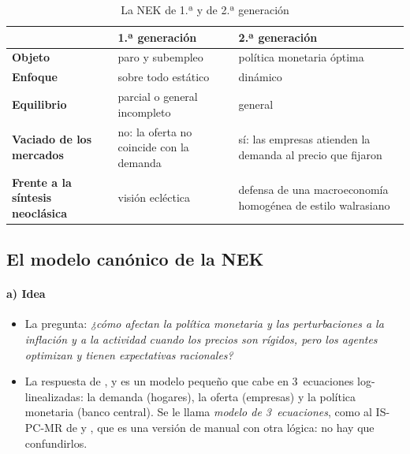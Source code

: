 \documentclass[11pt]{article}
\begin{document}
\begin{table}[H]
\centering
\caption{La NEK de 1.ª y de 2.ª generación}\label{tab:generaciones}
\small
\begin{tabular}{>{\raggedright\arraybackslash}m{3.6cm}>{\raggedright\arraybackslash}m{5cm}>{\raggedright\arraybackslash}m{5cm}}
\toprule
\rowcolor{tceeazulpalido} & \textbf{1.ª generación} & \textbf{2.ª generación}\\
\midrule
\textbf{Objeto} & \textcolor{tceemorado}{paro y subempleo} & \textcolor{tceeazul}{política monetaria óptima}\\
\textbf{Enfoque} & \textcolor{tceemorado}{sobre todo estático} & \textcolor{tceeazul}{dinámico}\\
\textbf{Equilibrio} & \textcolor{tceemorado}{parcial o general incompleto} & \textcolor{tceeazul}{general}\\
\textbf{Vaciado de los mercados} & \textcolor{tceemorado}{no: la oferta no coincide con la demanda} & \textcolor{tceeazul}{sí: las empresas atienden la demanda al precio que fijaron}\\
\textbf{Frente a la síntesis neoclásica} & \textcolor{tceemorado}{visión ecléctica} & \textcolor{tceeazul}{defensa de una macroeconomía homogénea de estilo walrasiano}\\
\bottomrule
\end{tabular}
\end{table}

\subsection{El modelo canónico de la NEK}\label{sec:modelo-canonico}

\paragraph{a) Idea}

\begin{itemize}
\item La pregunta: \emph{¿cómo afectan la política monetaria y las perturbaciones a la inflación y a la actividad cuando los precios son rígidos, pero los agentes optimizan y tienen expectativas racionales?}
\item La respuesta de \textcite{ClaridaGaliGertler1999Science}, \textcite{Woodford2003Interest} y \textcite{Gali2015Monetary} es un modelo pequeño que cabe en 3~ecuaciones log-linealizadas: la demanda (hogares), la oferta (empresas) y la política monetaria (banco central). Se le llama \emph{modelo de 3~ecuaciones}, como al IS-PC-MR de  y \nocite{CarlinSoskice2015Macroeconomics}, que es una versión de manual con otra lógica: no hay que confundirlos.
\end{itemize}
\end{document}
